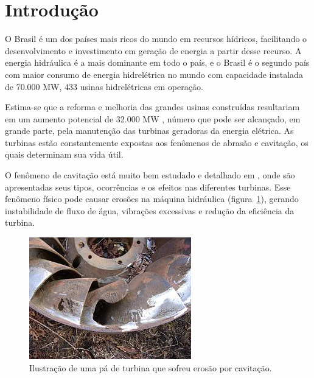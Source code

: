 \section{Introdução}
O Brasil é um dos países mais ricos do mundo em recursos hídricos, facilitando o
desenvolvimento e investimento em geração de energia a partir desse recurso. A
energia hidráulica é a mais dominante em todo o país, e o Brasil é o segundo
país com maior consumo de energia hidrelétrica no mundo com capacidade
instalada de 70.000 MW, 433 usinas hidrelétricas em operação. 

Estima-se que a reforma e melhoria das grandes usinas construídas resultariam
em um aumento potencial de 32.000 MW \citep{goldemberg2007energia},
número que pode ser alcançado, em grande parte, pela manutenção das turbinas
geradoras da energia elétrica. As turbinas estão constantemente expostas aos
fenômenos de abrasão e cavitação, os quais determinam sua vida útil.

O fenômeno de cavitação está muito bem estudado e detalhado em
\cite{escaler2006detection}, onde são apresentadas seus tipos, ocorrências e os
efeitos nas diferentes turbinas. Esse fenômeno físico pode causar erosões na
máquina hidráulica (figura~\ref{fig::cavitacao}), gerando instabilidade de fluxo
de água, vibrações excessivas e redução da eficiência da turbina.

\begin{figure}[h!]	
	\includegraphics[width=\columnwidth]{sota/figs/intro/cavitacao}
	\caption{Ilustração de uma pá de turbina que sofreu erosão por cavitação.}
	\label{fig::cavitacao}
\end{figure}

